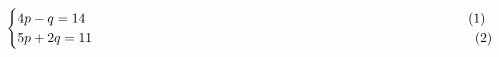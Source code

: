 \begin{equation*}
\begin{cases}
4p - q = 14
\hspace{10cm} (1) \\
5p + 2q = 11 \hspace{10 cm} (2)\end{cases}
\end{equation*}                                                    

